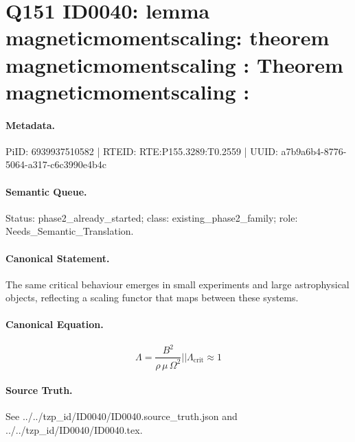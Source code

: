 \section*{Q151 ID0040: lemma magneticmomentscaling: theorem magneticmomentscaling : Theorem magneticmomentscaling :}
\paragraph{Metadata.}
PiID: 6939937510582 | RTEID: RTE:P155.3289:T0.2559 | UUID: a7b9a6b4-8776-5064-a317-c6c3990e4b4c

\paragraph{Semantic Queue.}
Status: phase2\_already\_started; class: existing\_phase2\_family; role: Needs\_Semantic\_Translation.

\paragraph{Canonical Statement.}
The same critical behaviour emerges in small experiments and large astrophysical objects, reflecting a scaling functor that maps between these systems.

\paragraph{Canonical Equation.}
\[
\Lambda = \frac{B^{2}}{\rho\,\mu\,\Omega^{2}} || \Lambda_{\mathrm{crit}} \approx 1
\]

\paragraph{Source Truth.}
See ../../tzp\_id/ID0040/ID0040.source\_truth.json and ../../tzp\_id/ID0040/ID0040.tex.
